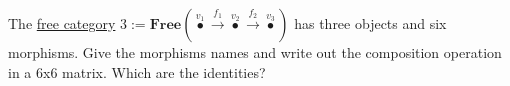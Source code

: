 The \hyperref[D3.7]{free category} $3 := \mathbf{Free}(\boxed{\overset{v_1}\bullet \xrightarrow{f_1}\overset{v_2}{\bullet}\xrightarrow{f_2}\overset{v_3}{\bullet}})$ has three objects and six morphisms. Give the morphisms names and write out the composition operation in a 6x6 matrix. Which are the identities?
